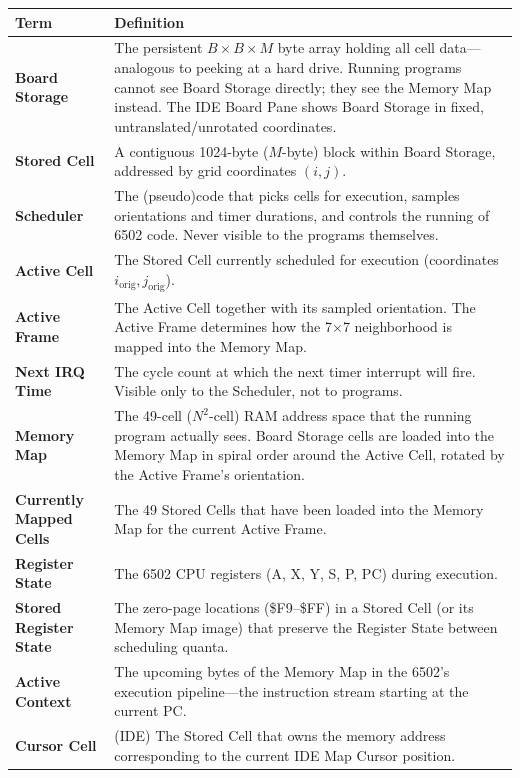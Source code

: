 \documentclass{article}
\begin{document}
\begin{tabular}{l|p{}}
  Term & Definition \\ \hline
  \textbf{Board Storage} & The persistent $B \times B \times M$ byte array
    holding all cell data---analogous to peeking at a hard drive.
    Running programs cannot see Board Storage directly; they see the
    Memory Map instead. The IDE Board Pane shows Board Storage in fixed,
    untranslated/unrotated coordinates. \\

  \textbf{Stored Cell} & A contiguous 1024-byte ($M$-byte) block within
    Board Storage, addressed by grid coordinates $(i,j)$. \\

  \textbf{Scheduler} & The (pseudo)code that picks cells for execution,
    samples orientations and timer durations, and controls the running of
    6502 code. Never visible to the programs themselves. \\

  \textbf{Active Cell} & The Stored Cell currently scheduled for
    execution (coordinates $i_{\mathrm{orig}}, j_{\mathrm{orig}}$). \\

  \textbf{Active Frame} & The Active Cell together with its sampled
    orientation. The Active Frame determines how the 7$\times$7
    neighborhood is mapped into the Memory Map. \\

  \textbf{Next IRQ Time} & The cycle count at which the next timer
    interrupt will fire. Visible only to the Scheduler, not to
    programs. \\

  \textbf{Memory Map} & The 49-cell ($N^2$-cell) RAM address space
    that the running program actually sees. Board Storage cells are
    loaded into the Memory Map in spiral order around the Active Cell,
    rotated by the Active Frame's orientation.  \\

  \textbf{Currently Mapped Cells} & The 49 Stored Cells that have been
    loaded into the Memory Map for the current Active Frame. \\

  \textbf{Register State} & The 6502 CPU registers (A, X, Y, S, P, PC)
    during execution. \\

  \textbf{Stored Register State} & The zero-page locations (\$F9--\$FF)
    in a Stored Cell (or its Memory Map image) that preserve the
    Register State between scheduling quanta. \\

  \textbf{Active Context} & The upcoming bytes of the Memory Map in the
    6502's execution pipeline---the instruction stream starting at the
    current PC. \\

  \textbf{Cursor Cell} & (IDE) The Stored Cell that owns the memory
    address corresponding to the current IDE Map Cursor position. \\
\end{tabular}
\end{document}
